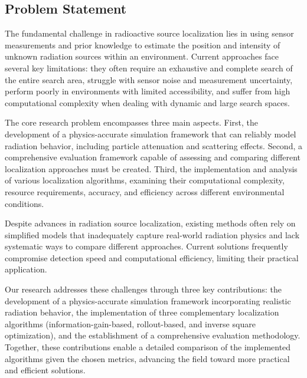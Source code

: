 \documentclass[../report.tex]{subfiles}
\begin{document}
    \subsection{Problem Statement}
    \label{sec:introduction:problem_statement}

    The fundamental challenge in radioactive source localization lies in using sensor measurements and prior knowledge to estimate the position and intensity of unknown radiation 
    sources within an environment. Current approaches face several key limitations: they often require an exhaustive and complete search of the entire search area, struggle with sensor noise and measurement 
    uncertainty, perform poorly in environments with limited accessibility, and suffer from high computational complexity when dealing with dynamic and large search spaces.
   
    The core research problem encompasses three main aspects. First, the development of a physics-accurate simulation framework that can reliably model radiation behavior, including particle 
    attenuation and scattering effects. Second, a comprehensive evaluation framework capable of assessing and comparing different localization approaches must be created. Third, the 
    implementation and analysis of various localization algorithms, examining their computational complexity, resource requirements, accuracy, and efficiency across different environmental conditions.
    \label{sec:introduction:proposed_approach}

    Despite advances in radiation source localization, existing methods often rely on simplified models that inadequately capture real-world radiation physics and 
    lack systematic ways to compare different approaches. Current solutions frequently compromise detection speed and computational efficiency, limiting their 
    practical application.
    
    
    Our research addresses these challenges through three key contributions: the development of a physics-accurate simulation framework incorporating realistic 
    radiation behavior, the implementation of three complementary localization algorithms (information-gain-based, rollout-based, and inverse square optimization), 
    and the establishment of a comprehensive evaluation methodology. Together, these contributions enable a detailed comparison of the implemented algorithms given 
    the chosen metrics, advancing the field toward more practical and efficient solutions.
\end{document}
